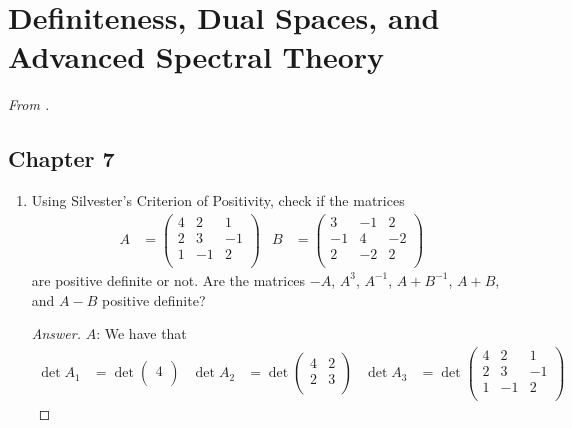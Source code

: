 \documentclass[../psets.tex]{subfiles}
\begin{document}
\section{Definiteness, Dual Spaces, and Advanced Spectral Theory}
\emph{From \textcite{bib:Treil}.}
\subsection*{Chapter 7}
\begin{enumerate}[label={\textbf{4.\arabic*.}}]
    \item {}Using Silvester's Criterion of Positivity, check if the matrices
    \begin{align*}
        A &=
        \begin{pmatrix}
            4 & 2 & 1\\
            2 & 3 & -1\\
            1 & -1 & 2\\
        \end{pmatrix}&
        B &=
        \begin{pmatrix}
            3 & -1 & 2\\
            -1 & 4 & -2\\
            2 & -2 & 2\\
        \end{pmatrix}
    \end{align*}
    are positive definite or not. Are the matrices $-A$, $A^3$, $A^{-1}$, $A+B^{-1}$, $A+B$, and $A-B$ positive definite?
    \begin{proof}[Answer]
        \underline{$A$}: We have that
        \begin{align*}
            \det A_1 &= \det
            \begin{pmatrix}
                4\\
            \end{pmatrix}&
                \det A_2 &= \det
                \begin{pmatrix}
                    4 & 2\\
                    2 & 3\\
                \end{pmatrix}&
                    \det A_3 &= \det
                    \begin{pmatrix}
                        4 & 2 & 1\\
                        2 & 3 & -1\\
                        1 & -1 & 2\\

\end{pmatrix}
\end{align*}
\end{proof}
\end{enumerate}
\end{document}
